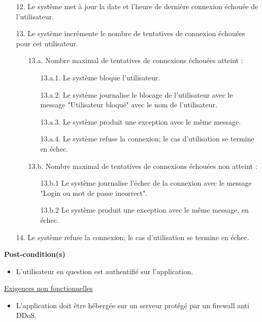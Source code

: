 \begin{itemize}
	\item[12.] Le système met à jour la date et l'heure de dernière connexion échouée de l'utilisateur.
	\item[13.] Le système incrémente le nombre de tentatives de connexion échouées pour cet utilisateur.
	\begin{itemize}
		\item[13.a.] Nombre maximal de tentatives de connexions échouées atteint :
		\begin{itemize}
			\item[13.a.1.] Le système bloque l'utilisateur.
			\item[13.a.2.] Le système journalise le blocage de l'utilisateur avec le message "Utilisateur bloqué" avec le nom de l'utilisateur.
			\item[13.a.3.] Le système produit une exception avec le même message.
			\item[13.a.4.] Le système refuse la connexion; le cas d'utilisation se termine en échec.
		\end{itemize}
		\item[13.b.] Nombre maximal de tentatives de connexions échouées non atteint :
		\begin{itemize}
			\item[13.b.1] Le système journalise l'échec de la connexion avec le message "Login ou mot de passe incorrect".
			\item[13.b.2] Le système produit une exception avec le même message. en échec.
		\end{itemize}
	\end{itemize}
	\item[14.] Le système refuse la connexion; le cas d'utilisation se termine en échec.
\end{itemize}
\textbf{Post-condition(s)}
\begin{itemize}
	\item L’utilisateur en question est authentifié sur l'application.
\end{itemize}
\underline{\underline{Exigences non fonctionnelles}}
\begin{itemize}
	\item L’application doit être hébergée sur un serveur protégé par un firewall anti DDoS.\\
\end{itemize}

